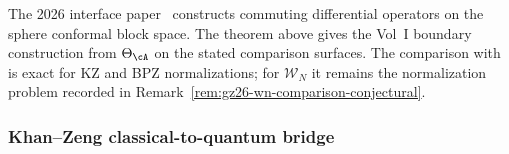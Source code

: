 \begin{remark}
\label{rem:sphere-reconstruction-gz26}
The 2026 interface paper~\cite{GZ26} constructs commuting differential
operators on the sphere conformal block space. The theorem above gives
the Vol~I boundary construction from $\Theta_\cA$ on the stated
comparison surfaces. The comparison with~\cite{GZ26} is exact for KZ
and BPZ normalizations; for $\mathcal W_N$ it remains the
normalization problem recorded in
Remark~\ref{rem:gz26-wn-comparison-conjectural}.
\end{remark}

\subsubsection{Khan--Zeng classical-to-quantum bridge}

